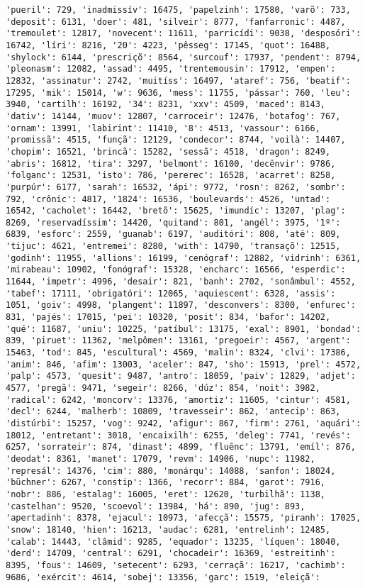 \documentclass[11pt]{article}
\begin{document}
\begin{Verbatim}[commandchars=\\\{\}]
'pueril': 729, 'inadmissív': 16475, 'papelzinh': 17580, 'varõ': 733, 'deposit': 6131, 'doer': 481, 'silveir': 8777, 'fanfarronic': 4487, 'tremoulet': 12817, 'novecent': 11611, 'parricídi': 9038, 'desposóri': 16742, 'líri': 8216, '20': 4223, 'pêsseg': 17145, 'quot': 16488, 'shylock': 6144, 'prescriçõ': 8564, 'surcouf': 17937, 'pendent': 8794, 'pleonasm': 12082, 'assad': 4495, 'trentemousin': 17912, 'empen': 12832, 'assinatur': 2742, 'muitíss': 16497, 'ataref': 756, 'beatif': 17295, 'mik': 15014, 'w': 9636, 'mess': 11755, 'pássar': 760, 'leu': 3940, 'cartilh': 16192, '34': 8231, 'xxv': 4509, 'maced': 8143, 'dativ': 14144, 'muov': 12807, 'carroceir': 12476, 'botafog': 767, 'ornam': 13991, 'labirint': 11410, '8': 4513, 'vassour': 6166, 'promissã': 4515, 'funçã': 12129, 'condecor': 8744, 'voilà': 14407, 'chopim': 16521, 'brincã': 15282, 'sessã': 4518, 'dragon': 8249, 'abris': 16812, 'tira': 3297, 'belmont': 16100, 'decênvir': 9786, 'folganc': 12531, 'isto': 786, 'pererec': 16528, 'acarret': 8258, 'purpúr': 6177, 'sarah': 16532, 'ápi': 9772, 'rosn': 8262, 'sombr': 792, 'crônic': 4817, '1824': 16536, 'boulevards': 4526, 'untad': 16542, 'cacholet': 16442, 'bretõ': 15625, 'imundíc': 13207, 'plag': 8269, 'reservadíssim': 14420, 'quitand': 801, 'angél': 3975, '1º': 6839, 'esforc': 2559, 'guanab': 6197, 'auditóri': 808, 'até': 809, 'tijuc': 4621, 'entremei': 8280, 'with': 14790, 'transaçõ': 12515, 'godinh': 11955, 'allions': 16199, 'cenógraf': 12882, 'vidrinh': 6361, 'mirabeau': 10902, 'fonógraf': 15328, 'encharc': 16566, 'esperdic': 11644, 'impetr': 4996, 'desair': 821, 'banh': 2702, 'sonâmbul': 4552, 'tabef': 17111, 'obrigatóri': 12065, 'aquiescent': 6328, 'assis': 1051, 'goiv': 4998, 'plangent': 11897, 'desconvers': 8300, 'enfurec': 831, 'pajés': 17015, 'pei': 10320, 'posit': 834, 'bafor': 14202, 'qué': 11687, 'uniu': 10225, 'patíbul': 13175, 'exal': 8901, 'bondad': 839, 'piruet': 11362, 'melpômen': 13161, 'pregoeir': 4567, 'argent': 15463, 'tod': 845, 'escultural': 4569, 'malin': 8324, 'clvi': 17386, 'anim': 846, 'afim': 13003, 'aceler': 847, 'sho': 15913, 'prel': 4572, 'palp': 4573, 'quesit': 9487, 'antro': 18059, 'paiv': 12829, 'adjet': 4577, 'pregã': 9471, 'segeir': 8266, 'dúz': 854, 'noit': 3982, 'radical': 6242, 'moncorv': 13376, 'amortiz': 11605, 'cintur': 4581, 'decl': 6244, 'malherb': 10809, 'travesseir': 862, 'antecip': 863, 'distúrbi': 15257, 'vog': 9242, 'afigur': 867, 'firm': 2761, 'aquári': 18012, 'entretant': 3018, 'encaixilh': 6255, 'deleg': 7741, 'revés': 6257, 'sorrateir': 874, 'dinast': 4899, 'fluênc': 13791, 'emíl': 876, 'deodat': 8361, 'manet': 17079, 'revm': 14906, 'nupc': 11982, 'represál': 14376, 'cim': 880, 'monárqu': 14088, 'sanfon': 18024, 'büchner': 6267, 'constip': 1366, 'recorr': 884, 'garot': 7916, 'nobr': 886, 'estalag': 16005, 'eret': 12620, 'turbilhã': 1138, 'castelhan': 9520, 'scoevol': 13984, 'há': 890, 'jug': 893, 'apertadinh': 8378, 'ejacul': 10973, 'afecçã': 15575, 'piranh': 17025, 'snow': 18140, 'hien': 16213, 'audac': 6281, 'entrelinh': 12485, 'calab': 14443, 'clâmid': 9285, 'equador': 13235, 'líquen': 18040, 'derd': 14709, 'central': 6291, 'chocadeir': 16369, 'estreitinh': 8395, 'fous': 14609, 'setecent': 6293, 'cerraçã': 16217, 'cachimb': 9686, 'exércit': 4614, 'sobej': 13356, 'garc': 1519, 'eleiçã': 
\end{Verbatim}
\end{document}
